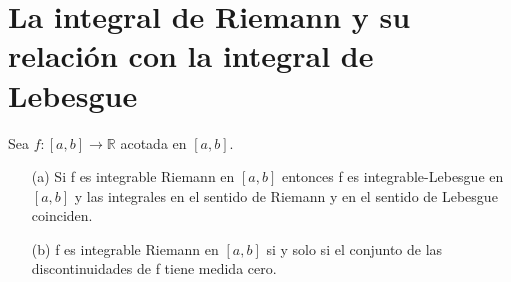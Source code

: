 \section{La integral de Riemann y su relación con la integral de Lebesgue}

\begin{teo}
Sea $f: [a,b] \longrightarrow \mathbb{R}$ acotada en $[a,b]$.
\begin{enumerate}
    \item[(a)] Si f es integrable Riemann en $[a,b]$ entonces f es integrable-Lebesgue en $[a,b]$ y las integrales en el sentido de Riemann y en el sentido de Lebesgue coinciden.
    \item[(b)] f es integrable Riemann en $[a,b]$ si y solo si el conjunto de las discontinuidades de f tiene medida cero.
\end{enumerate}
\end{teo}

